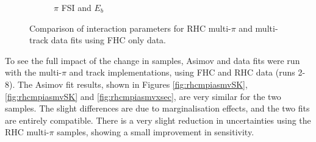 \begin{figure}[t]
\begin{subfigure}{0.49\textwidth}
  \caption{$\pi$ FSI and $E_b$}
\end{subfigure}
\caption{Comparison of interaction parameters for RHC multi-$\pi$ and multi-track data fits using FHC only data.}
\label{fig:rhcmpidat248xsec}
\end{figure}

To see the full impact of the change in samples, Asimov and data fits were run with the multi-$\pi$ and track implementations, using FHC and RHC data (runs 2-8). The Asimov fit results, shown in Figures \ref{fig:rhcmpiasmvSK}, \ref{fig:rhcmpiasmvSK} and \ref{fig:rhcmpiasmvxsec}, are very similar for the two samples. The slight differences are due to marginalisation effects, and the two fits are entirely compatible. There is a very slight reduction in uncertainties using the RHC multi-$\pi$ samples, showing a small improvement in sensitivity.

